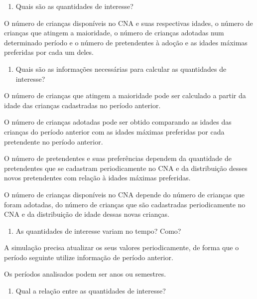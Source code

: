 \documentclass[]{book}
\providecommand{\tightlist}{%
  \setlength{\itemsep}{0pt}\setlength{\parskip}{0pt}}
\begin{document}
\begin{enumerate}
\def\labelenumi{\arabic{enumi}.}
\tightlist
\item
  Quais são as quantidades de interesse?
\end{enumerate}

O número de crianças disponíveis no CNA e suas respectivas idades, o
número de crianças que atingem a maioridade, o número de crianças
adotadas num determinado período e o número de pretendentes à adoção e
as idades máximas preferidas por cada um deles.

\begin{enumerate}
\def\labelenumi{\arabic{enumi}.}
\setcounter{enumi}{1}
\tightlist
\item
  Quais são as informações necessárias para calcular as quantidades de
  interesse?
\end{enumerate}

O número de crianças que atingem a maioridade pode ser calculado a
partir da idade das crianças cadastradas no período anterior.

O número de crianças adotadas pode ser obtido comparando as idades das
crianças do período anterior com as idades máximas preferidas por cada
pretendente no período anterior.

O número de pretendentes e suas preferências dependem da quantidade de
pretendentes que se cadastram periodicamente no CNA e da distribuição
desses novos pretendentes com relação à idades máximas preferidas.

O número de crianças disponíveis no CNA depende do número de crianças
que foram adotadas, do número de crianças que são cadastradas
periodicamente no CNA e da distribuição de idade dessas novas crianças.

\begin{enumerate}
\def\labelenumi{\arabic{enumi}.}
\setcounter{enumi}{3}
\tightlist
\item
  As quantidades de interesse variam no tempo? Como?
\end{enumerate}

A simulação precisa atualizar os seus valores periodicamente, de forma
que o período seguinte utilize informação de período anterior.

Os períodos analisados podem ser anos ou semestres.

\begin{enumerate}
\def\labelenumi{\arabic{enumi}.}
\setcounter{enumi}{2}
\tightlist
\item
  Qual a relação entre as quantidades de interesse?
\end{enumerate}
\end{document}
